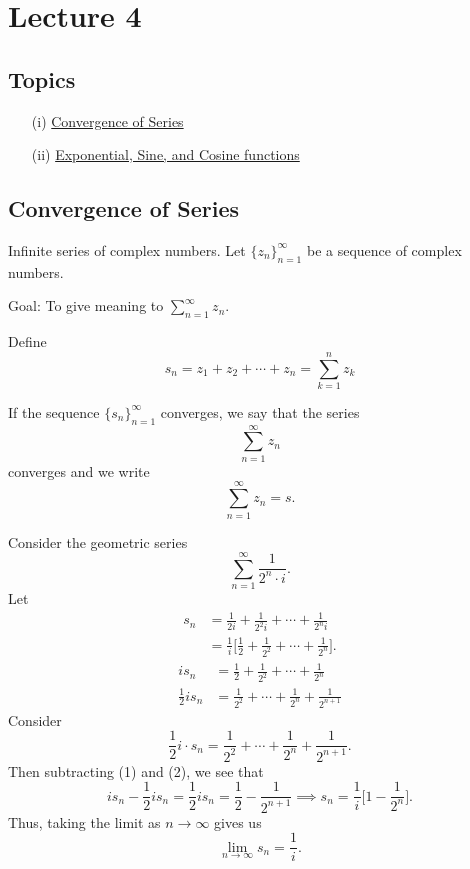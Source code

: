 \documentclass[a4paper]{report}
\begin{document}
\section{Lecture 4}

\subsection{Topics}

\begin{enumerate}
    \item[(i)] {\hyperref[Convergence of Series]{Convergence of Series}} 
    \item[(ii)] {\hyperref[Exponential, Sine, and Cosine functions]{Exponential, Sine, and Cosine functions}} 
\end{enumerate}


\subsection{Convergence of Series}\label{Convergence of Series}

Infinite series of complex numbers. Let \( \{ {z}_{n} \}_{n=1}^{\infty } \) be a sequence of complex numbers. 

Goal: To give meaning to \( \sum_{ n=1  }^{ \infty  } {z}_{n} \).

Define \[ {s}_{n} = {z}_{1} + {z}_{2} + \cdots + {z}_{n} = \sum_{ k = 1  }^{ n } {z}_{k} \] 
\begin{definition}
    If the sequence \( \{ {s}_{n} \}_{n=1}^{\infty } \) converges, we say that the series  
    \[  \sum_{ n=1  }^{ \infty  } {z}_{n} \]
    converges and we write
    \[  \sum_{ n = 1  }^{  \infty   } {z}_{n} = s. \]
\end{definition}

\begin{eg}
    Consider the geometric series
    \[  \sum_{ n=1  }^{ \infty  } \frac{ 1  }{ 2^{n} \cdot i  }. \]
    Let 
    \begin{align*}
    {s}_{n} &= \frac{ 1 }{ 2 i  }  + \frac{ 1 }{ 2^{2} i   } + \cdots + \frac{ 1  }{ 2^{n} i  }   \\
            &=  \frac{ 1 }{ i }  \Big[ \frac{ 1 }{ 2 }  + \frac{ 1 }{ 2^{2} }  + \cdots + \frac{ 1 }{ 2^{n} } \Big].
\end{align*}
\begin{align*}
    i {s}_{n} &= \frac{ 1 }{ 2 }  + \frac{ 1 }{ 2^{2}  } + \cdots + \frac{ 1 }{ 2^{n} } \tag{1}  \\
    \frac{ 1 }{ 2 }  i {s}_{n} &= \frac{ 1 }{ 2^{2}  }  + \cdots + \frac{ 1 }{ 2^{n}  } + \frac{ 1 }{ 2^{n+1} } \tag{2}
\end{align*}
Consider
\[  \frac{ 1 }{ 2 }  i \cdot {s}_{n} = \frac{ 1 }{ 2^{2}  }  + \cdots + \frac{ 1 }{ 2^{n} }  + \frac{ 1 }{  2^{n+1} }.  \]
Then subtracting (1) and (2), we see that
\[ i {s}_{n} - \frac{ 1 }{ 2 }  i {s}_{n} =   \frac{ 1 }{ 2 }  i {s}_{n} = \frac{ 1 }{ 2 }  - \frac{ 1 }{ 2^{n+1} } \implies {s}_{n} = \frac{ 1 }{ i }  \Big[ 1 - \frac{ 1 }{ 2^{n} } \Big].   \]
Thus, taking the limit as \( n \to \infty   \) gives us 
\[  \lim_{ n \to \infty  }  {s}_{n} = \frac{ 1 }{ i }. \]
\end{eg}
\end{document}
